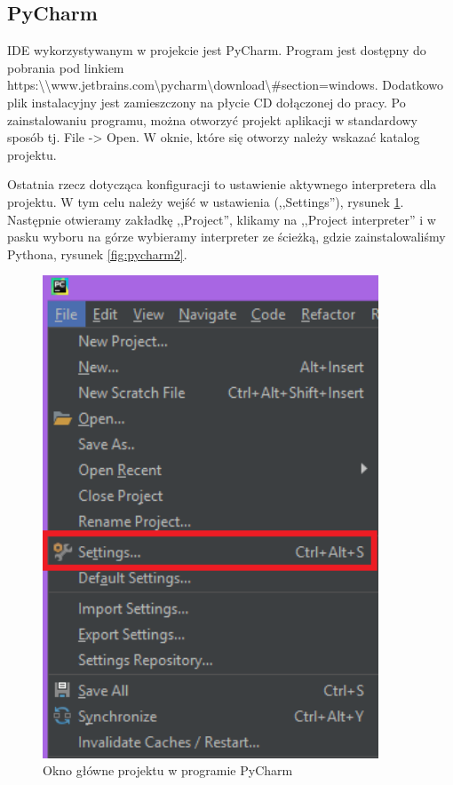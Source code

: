 \subsection{PyCharm}
\label{sec:pycharm}

IDE wykorzystywanym w projekcie jest PyCharm. Program jest dostępny do pobrania pod linkiem https:\textbackslash \textbackslash www.jetbrains.com\textbackslash pycharm\textbackslash download\textbackslash \#section=windows. Dodatkowo plik instalacyjny jest zamieszczony na płycie CD dołączonej do pracy. Po zainstalowaniu programu, można otworzyć projekt aplikacji w standardowy sposób tj. File -> Open. W oknie, które się otworzy należy wskazać katalog projektu.

Ostatnia rzecz dotycząca konfiguracji to ustawienie aktywnego interpretera dla projektu. W tym celu należy wejść w ustawienia (,,Settings''), rysunek \ref{fig:pycharm1}. Następnie otwieramy zakładkę ,,Project'', klikamy na ,,Project interpreter'' i w pasku wyboru na górze wybieramy interpreter ze ścieżką, gdzie zainstalowaliśmy Pythona, rysunek \ref{fig:pycharm2}.

\begin{figure}[h]
\centering
\includegraphics[width=10cm]{Zdjecia/5/pycharm3}
\caption{Okno główne projektu w programie PyCharm}
\label{fig:pycharm1}
\end{figure}


